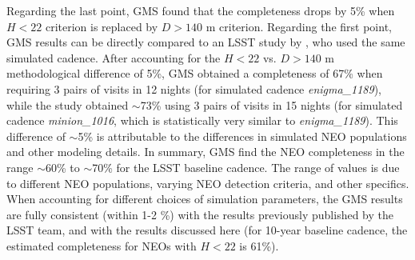 Regarding the last point, GMS found that the completeness drops by 5\% when $H<22$ criterion is
replaced by $D>140$ m criterion. Regarding  the first point, GMS results can be directly compared to an
LSST study by \cite{JJI2016}, who used the same simulated cadence. After accounting for the $H<22$ vs.
$D>140$ m methodological difference of 5\%, GMS obtained a completeness of 67\% when requiring
3 pairs of visits in 12 nights (for simulated cadence {\it enigma\_1189}), while the \citet{JJI2016}
study obtained $\sim$73\% using 3 pairs of visits in 15 nights (for simulated cadence {\it minion\_1016},
which is statistically very similar to {\it enigma\_1189}). This difference of $\sim$5\% is attributable to
the differences in simulated NEO populations and other modeling details. In summary, GMS find the NEO
completeness in the range $\sim$60\% to $\sim$70\% for the LSST baseline cadence. The range of values
is due to different NEO populations, varying NEO detection criteria, and other specifics. When accounting
for different choices of simulation parameters, the GMS results are fully consistent (within 1-2 \%) with
the results previously published by the LSST team, and with the results discussed here (for 10-year baseline
cadence, the estimated completeness for NEOs with $H<22$ is 61\%).
